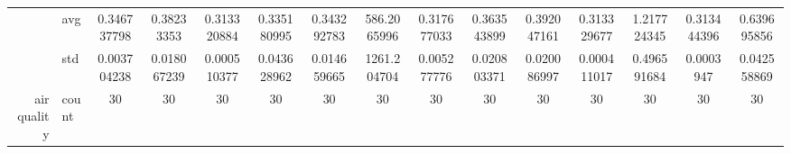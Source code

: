 \begin{table}[htbp]
{\begin{tabular}{rlccc|c|c|c|c|c|ccccc}
			                                                                               & avg                & \cellcolor[rgb]{ 1,  .922,  .518}0.346737798                                   & \cellcolor[rgb]{ 1,  .922,  .518}0.38233353                                    & \cellcolor[rgb]{ .388,  .745,  .482}\textcolor[rgb]{ 0,  .38,  0}{0.313320884} & \cellcolor[rgb]{ .788,  .859,  .502}0.335180995 & \cellcolor[rgb]{ .933,  .902,  .514}0.343292783                                & \cellcolor[rgb]{ .973,  .412,  .42}586.2065996  & \cellcolor[rgb]{ .467,  .765,  .486}0.317677033                                & \cellcolor[rgb]{ 1,  .922,  .518}0.363543899    & \cellcolor[rgb]{ 1,  .922,  .518}0.392047161    & \cellcolor[rgb]{ .388,  .745,  .482}0.313329677 & \cellcolor[rgb]{ 1,  .922,  .518}1.217724345    & \cellcolor[rgb]{ .388,  .745,  .482}0.313444396 & \cellcolor[rgb]{ 1,  .922,  .518}0.639695856    \\
			                                                                               & std                & 0.003704238                                                                    & 0.018067239                                                                    & 0.000510377                                                                    & 0.043628962                                     & 0.014659665                                                                    & 1261.204704                                     & 0.005277776                                                                    & 0.020803371                                     & 0.020086997                                     & 0.000411017                                     & 0.496591684                                     & 0.0003947                                       & 0.042558869                                     \\
			air quality                                                                    & count              & 30                                                                             & 30                                                                             & 30                                                                             & 30                                              & 30                                                                             & 30                                              & 30                                                                             & 30                                              & 30                                              & 30                                              & 30                                              & 30                                              & 30                                              \\

\end{tabular}}
\end{table}
